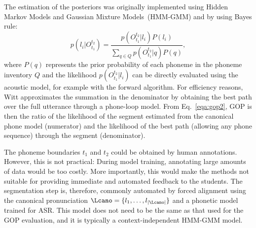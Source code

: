 The estimation of the posteriors was originally implemented using Hidden Markov Models and Gaussian Mixture Models~(HMM-GMM) and by using Bayes rule:
\begin{equation}
    \label{eqa:gop2}
    \textit{p}(l_i|O_{t_1}^{t_2})=\frac{\mathit{p}(O_{t_1}^{t_2}|l_i)\mathit{P}(l_i)}{\sum_{q\in Q} \mathit{p}(O_{t_1}^{t_2}|q)\mathit{P}(q)},
\end{equation}
where $\mathit{P}(q)$ represents the prior probability of each phoneme in the phoneme inventory $Q$ and the likelihood $\mathit{p}(O_{t_1}^{t_2}|l_i)$ can be directly evaluated using the acoustic model, for example with the forward algorithm.
For efficiency reasons, Witt approximates the summation in the denominator by obtaining the best path over the full utterance through a phone-loop model.
From Eq.~\eqref{eqa:gop2}, GOP is then the ratio of the likelihood of the segment estimated from the canonical phone model (numerator) and the likelihood of the best path (allowing any phone sequence) through the segment (denominator). 

The phoneme boundaries $t_1$ and $t_2$ could be obtained by human annotations.
However, this is not practical:
During model training, annotating large amounts of data would be too costly.
More importantly, this would make the methods not suitable for providing immediate and automated feedback to the students.
The segmentation step is, therefore, commonly automated by forced alignment using the canonical pronunciation  $\Lcano = \{l_1, \dots, l_{|\Lcano|}\}$ and a phonetic model trained for ASR.
This model does not need to be the same as that used for the GOP evaluation, and it is typically a context-independent HMM-GMM model.


